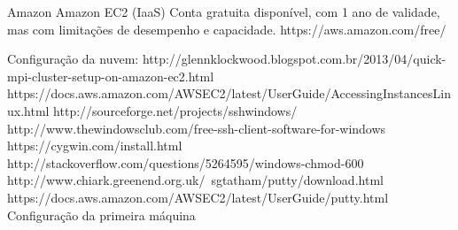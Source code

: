 Amazon
Amazon EC2 (IaaS)
Conta gratuita disponível, com 1 ano de validade, mas com limitações de desempenho e capacidade. https://aws.amazon.com/free/

Configuração da nuvem: http://glennklockwood.blogspot.com.br/2013/04/quick-mpi-cluster-setup-on-amazon-ec2.html
https://docs.aws.amazon.com/AWSEC2/latest/UserGuide/AccessingInstancesLinux.html
http://sourceforge.net/projects/sshwindows/
http://www.thewindowsclub.com/free-ssh-client-software-for-windows
https://cygwin.com/install.html
http://stackoverflow.com/questions/5264595/windows-chmod-600
http://www.chiark.greenend.org.uk/~sgtatham/putty/download.html
https://docs.aws.amazon.com/AWSEC2/latest/UserGuide/putty.html
Configuração da primeira máquina
